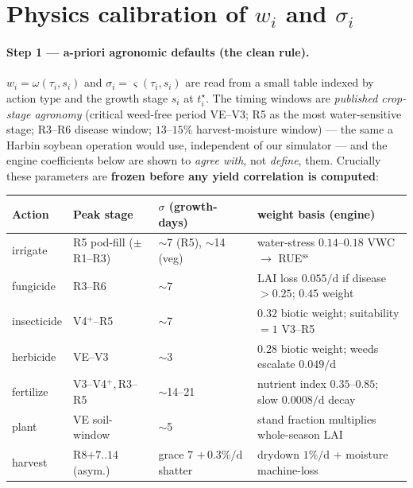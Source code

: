 \documentclass[11pt]{article}
\begin{document}
\section{Physics calibration of $w_i$ and $\sigma_i$}
\label{sec:calib}

\paragraph{Step 1 --- a-priori agronomic defaults (the clean rule).}
$w_i=\omega(\tau_i,s_i)$ and $\sigma_i=\varsigma(\tau_i,s_i)$ are read from a
small table indexed by action type and the growth stage $s_i$ at $t^\star_i$.
The timing windows are \emph{published crop-stage agronomy} (critical weed-free
period VE--V3; R5 as the most water-sensitive stage; R3--R6 disease window;
$13$--$15\%$ harvest-moisture window) --- the same a Harbin soybean operation
would use, independent of our simulator --- and the engine coefficients below
are shown to \emph{agree with}, not \emph{define}, them. Crucially these
parameters are \textbf{frozen before any yield correlation is computed}:

\begin{center}\small
\begin{tabular}{llll}
\toprule
Action & Peak stage & $\sigma$ (growth-days) & weight basis (engine) \\
\midrule
irrigate     & R5 pod-fill ($\pm$R1--R3)     & $\sim$7 (R5), $\sim$14 (veg) & water-stress $0.14$--$0.18$ VWC $\to$ RUE$^{\text{ss}}$ \\
fungicide    & R3--R6                        & $\sim$7  & LAI loss $0.055/\text{d}$ if disease$>0.25$; $0.45$ weight \\
insecticide  & V4$^+$--R5                    & $\sim$7  & $0.32$ biotic weight; suitability $=1$ V3--R5 \\
herbicide    & VE--V3                        & $\sim$3  & $0.28$ biotic weight; weeds escalate $0.049/\text{d}$ \\
fertilize    & V3--V4$^+$,\,R3--R5           & $\sim$14--21 & nutrient index $0.35$--$0.85$; slow $0.0008/\text{d}$ decay \\
plant        & VE soil-window               & $\sim$5  & stand fraction multiplies whole-season LAI \\
harvest      & R8$+7$..$14$ (asym.)          & grace $7$ $+\,0.3\%/\text{d}$ shatter & drydown $1\%/\text{d}$ + moisture machine-loss \\
\bottomrule
\end{tabular}
\end{center}
\end{document}
